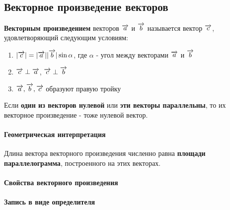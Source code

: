 \documentclass{article}
\def\vec{\ensuremath\overrightarrow}
\begin{document}
\subsection{Векторное произведение векторов}

\begin{flushleft}

\textbf{Векторным произведением} векторов $\vec{a}$ и $\vec{b}$ называется вектор $\vec{c}$, удовлетворяющий следующим условиям:

\begin{enumerate}
    \item $|\vec{c}| = |\vec{a}| |\vec{b}| \sin \alpha$, где $\alpha$ - угол между векторами $\vec{a}$ и $\vec{b}$
    \item $\vec{c} \perp \vec{a}$, $\vec{c} \perp \vec{b}$
    \item $\vec{a}, \vec{b}, \vec{c}$ образуют правую тройку
\end{enumerate}

Если \textbf{один из векторов нулевой} или \textbf{эти векторы параллельны}, то их векторное произведение - тоже нулевой вектор.

\paragraph{Геометрическая интерпретация}

Длина вектора векторного произведения численно равна \textbf{площади параллелограмма}, построенного на этих векторах.

\paragraph{Свойства векторного произведения}

\begin{multienumerate}
\end{multienumerate}

\paragraph{Запись в виде определителя}

\hfill


\end{flushleft}
\end{document}

